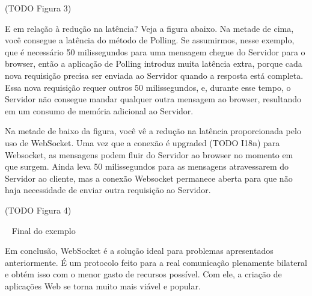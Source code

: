 \documentclass[a4paper,12pt]{article}
\begin{document}
(TODO Figura 3)

E em relação à redução na latência? Veja a figura abaixo. Na metade de cima, você consegue a latência do método de Polling. Se assumirmos, nesse exemplo, que é necessário 50 milissegundos para uma mensagem chegue do Servidor para o browser, então a aplicação de Polling introduz muita latência extra, porque cada nova requisição precisa ser enviada ao Servidor quando a resposta está completa. Essa nova requisição requer outros 50 milissegundos, e, durante esse tempo, o Servidor não consegue mandar qualquer outra mensagem ao browser, resultando em um consumo de memória adicional ao Servidor.

Na metade de baixo da figura, você vê a redução na latência proporcionada pelo uso de WebSocket. Uma vez que a conexão é upgraded (TODO I18n) para Websocket, as mensagens podem fluir do Servidor ao browser no momento em que surgem. Ainda leva 50 milissegundos para as mensagens atravessarem do Servidor ao cliente, mas a conexão Websocket permanece aberta para que não haja necessidade de enviar outra requisição ao Servidor.


(TODO Figura 4)

~ Final do exemplo ~



Em conclusão, WebSocket é a solução ideal para problemas apresentados anteriormente. É um protocolo feito para a real comunicação plenamente bilateral e obtém isso com o menor gasto de recursos possível. Com ele, a criação de aplicações Web se torna muito mais viável e popular.
\end{document}
